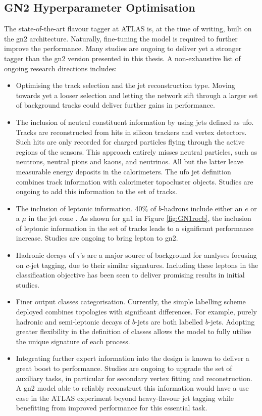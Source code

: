 \subsection{GN2 Hyperparameter Optimisation}\label{chap-GN2Opt}
The state-of-the-art flavour tagger at ATLAS is, at the time of writing, built on the \gls{gn2} architecture. Naturally, fine-tuning the model is required to further improve the performance. Many studies are ongoing to deliver yet a stronger tagger than the \gls{gn2} version presented in this thesis. A non-exhaustive list of ongoing research directions includes: 
\begin{itemize}
  \item Optimising the track selection and the jet reconstruction type. Moving towards yet a looser selection and letting the network sift through a larger set of background tracks could deliver further gains in performance.
  \item The inclusion of neutral constituent information by using jets defined as \gls{ufo}. Tracks are reconstructed from hits in silicon trackers and vertex detectors. Such hits are only recorded for charged particles flying through the active regions of the sensors. This approach entirely misses neutral particles, such as neutrons, neutral pions and kaons, and neutrinos. All but the latter leave measurable energy deposits in the calorimeters. The \gls{ufo} jet definition combines track information with calorimeter topocluster objects. Studies are ongoing to add this information to the set of tracks. 
  \item The inclusion of leptonic information. 40\% of $b$-hadrons include either an $e$ or a $\mu$ in the jet cone \cite{Tanabashi:2018oca}. As shown for \gls{gn1} in Figure \ref{fig:GN1rocb}, the inclusion of leptonic information in the set of tracks leads to a significant performance increase. Studies are ongoing to bring lepton to \gls{gn2}.
  \item Hadronic decays of $\tau$'s are a major source of background for analyses focusing on $c$-jet tagging, due to their similar signatures. Including these leptons in the classification objective has been seen to deliver promising results in initial studies. 
  \item Finer output classes categorisation. Currently, the simple labelling scheme deployed combines topologies with significant differences. For example, purely hadronic and semi-leptonic decays of $b$-jets are both labelled $b$-jets. Adopting greater flexibility in the definition of classes allows the model to fully utilise the unique signature of each process. 
  \item Integrating further expert information into the design is known to deliver a great boost to performance. Studies are ongoing to upgrade the set of auxiliary tasks, in particular for secondary vertex fitting and reconstruction. A \gls{gn2} model able to reliably reconstruct this information would have a use case in the ATLAS experiment beyond heavy-flavour jet tagging while benefitting from improved performance for this essential task.  
\end{itemize}

